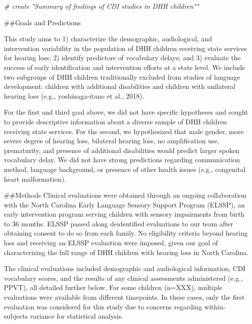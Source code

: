 \documentclass[
]{article}
\newenvironment{Shaded}{\begin{snugshade}}{\end{snugshade}}
\newcommand{\CommentTok}[1]{\textcolor[rgb]{0.56,0.35,0.01}{\textit{#1}}}
\begin{document}
\begin{Shaded}
\begin{Highlighting}[]
\CommentTok{# create "Summary of findings of CDI studies in DHH children""}
\end{Highlighting}
\end{Shaded}

\#\#Goals and Predictions

This study aims to 1) characterize the demographic, audiological, and
intervention variability in the population of DHH children receiving
state services for hearing loss; 2) identify predictors of vocabulary
delays; and 3) evaluate the success of early identification and
intervention efforts at a state level. We include two subgroups of DHH
children traditionally excluded from studies of language development:
children with additional disabilities and children with unilateral
hearing loss (e.g., yoshinaga-itano et al., 2018).

For the first and third goal above, we did not have specific hypotheses
and sought to provide descriptive information about a diverse sample of
DHH children receiving state services. For the second, we hypothesized
that male gender, more severe degree of hearing loss, bilateral hearing
loss, no amplification use, prematurity, and presence of additional
disabilities would predict larger spoken vocabulary delay. We did not
have strong predictions regarding communication method, language
background, or presence of other health issues (e.g., congenital heart
malformation).

\#\#Methods Clinical evaluations were obtained through an ongoing
collaboration with the North Carolina Early Language Sensory Support
Program (ELSSP), an early intervention program serving children with
sensory impairments from birth to 36 months. ELSSP passed along
deidentified evaluations to our team after obtaining consent to do so
from each family. No eligibility criteria beyond hearing loss and
receiving an ELSSP evaluation were imposed, given our goal of
characterizing the full range of DHH children with hearing loss in North
Carolina.

The clinical evaluations included demographic and audiological
information, CDI vocabulary scores, and the results of any clinical
assessments administered (e.g., PPVT), all detailed further below. For
some children (n=XXX), multiple evaluations were available from
different timepoints. In these cases, only the first evaluation was
considered for this study due to concerns regarding within-subjects
variance for statistical analysis.
\end{document}
